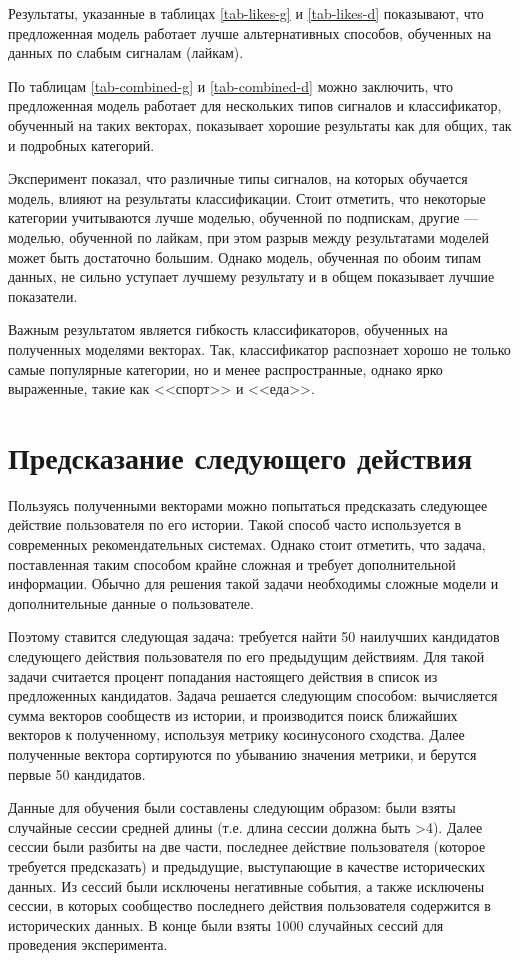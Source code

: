 \documentclass[times,specification,annotation]{itmo-student-thesis}
\begin{document}
Результаты, указанные в таблицах \ref{tab-likes-g} и \ref{tab-likes-d} показывают, что предложенная модель работает лучше альтернативных способов, обученных на данных по слабым сигналам (лайкам).

По таблицам \ref{tab-combined-g} и \ref{tab-combined-d} можно заключить, что предложенная модель работает для нескольких типов сигналов и классификатор, обученный на таких векторах, показывает хорошие результаты как для общих, так и подробных категорий.

Эксперимент показал, что различные типы сигналов, на которых обучается модель, влияют на результаты классификации.  
Стоит отметить, что некоторые категории учитываются лучше моделью, обученной по подпискам, другие --- моделью, обученной по лайкам, при этом разрыв между результатами моделей может быть достаточно большим. Однако модель, обученная по обоим типам данных, не сильно уступает лучшему результату и в общем показывает лучшие показатели.

Важным результатом является гибкость классификаторов, обученных на полученных моделями векторах. Так, классификатор распознает хорошо не только самые популярные категории, но и менее распространные, однако ярко выраженные, такие как <<спорт>> и <<еда>>. 

\section{Предсказание следующего действия}\label{sec:next-action}
Пользуясь полученными векторами можно попытаться предсказать следующее действие пользователя по его истории. Такой способ часто используется в современных рекомендательных системах. Однако стоит отметить, что задача, поставленная таким способом крайне сложная и требует дополнительной информации. Обычно для решения такой задачи необходимы сложные модели и дополнительные данные о пользователе. 

Поэтому ставится следующая задача: требуется найти 50 наилучших кандидатов следующего действия пользователя по его предыдущим действиям. Для такой задачи считается процент попадания настоящего действия в список из предложенных кандидатов. Задача решается следующим способом: вычисляется сумма векторов сообществ из истории, и производится поиск ближайших векторов к полученному, используя метрику косинусоного сходства. Далее полученные вектора сортируются по убыванию значения метрики, и берутся первые 50 кандидатов.

Данные для обучения были составлены следующим образом: были взяты случайные сессии средней длины (т.е. длина сессии должна быть >4). Далее сессии были разбиты на две части, последнее действие пользователя (которое требуется предсказать) и предыдущие, выступающие в качестве исторических данных. Из сессий были исключены негативные события, а также исключены сессии, в которых сообщество последнего действия пользователя содержится в исторических данных. В конце были взяты 1000 случайных сессий для проведения эксперимента. 
\end{document}
